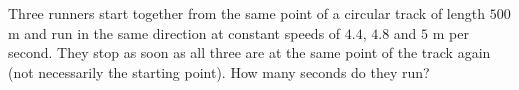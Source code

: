 Three runners start together from the same point of a circular track of length $500$ m and run in the same direction at constant speeds of $4.4$, $4.8$ and $5$ m per second. They stop as soon as all three are at the same point of the track again (not necessarily the starting point). How many seconds do they run?
